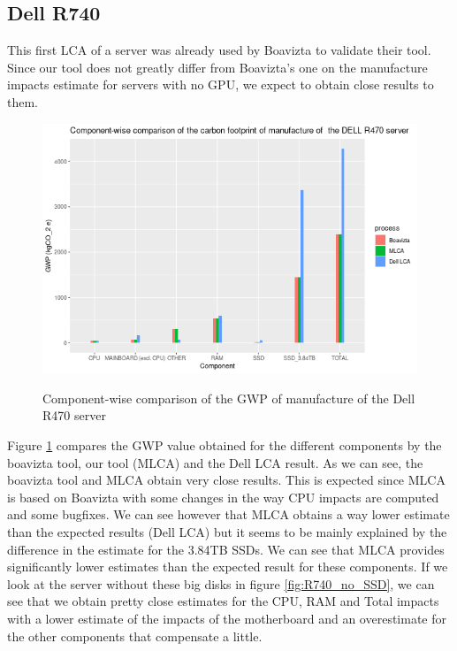 \documentclass[11pt]{article}
\begin{document}
\subsection{Dell R740}
\label{sec:org840cf13}
\label{sec:R740}

This first \gls{LCA} of a server was already used by Boavizta to
validate their tool. Since our tool does not greatly differ from
Boavizta's one on the manufacture impacts estimate for servers with no
GPU, we expect to obtain close results to them.
\begin{figure}[t]
  \centering
  \includegraphics[width=.95\linewidth,page=1]{./figures/R470.png}                                                                                                                               
  \label{fig:R740}
  \caption{Component-wise comparison of the GWP of manufacture of the Dell R470 server}
\end{figure}


Figure \ref{fig:R740} compares the \gls{GWP} value obtained for the
different components by the boavizta tool, our tool (MLCA) and the
Dell \gls{LCA} result. As we can see, the boavizta tool and MLCA
obtain very close results. This is expected since MLCA is based on
Boavizta with some changes in the way CPU impacts are computed and
some bugfixes. We can see however that MLCA obtains a way lower
estimate than the expected results (Dell \gls{LCA}) but it seems to be
mainly explained by the difference in the estimate for the 3.84TB
SSDs. We can see that MLCA provides significantly lower estimates than
the expected result for these components. If we look at the server
without these big disks in figure \ref{fig:R740_no_SSD}, we can see that we obtain pretty close
estimates for the CPU, RAM and Total impacts with a lower estimate of
the impacts of the motherboard and an overestimate for the other
components that compensate a little.
\end{document}
